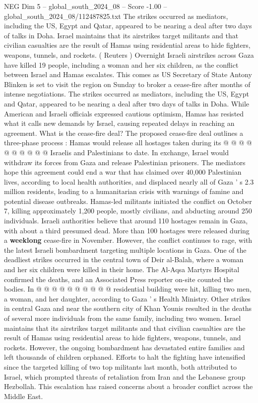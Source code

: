 \begin{textsample}{NEG Dim 5 – global\_south\_2024\_08 – Score -1.00 – global\_south\_2024\_08/112487825.txt}  \label{ex:f5_neg_122}
The strikes occurred as mediators, including the US, Egypt and Qatar, appeared to be nearing a deal after two days of talks in Doha.
Israel maintains that its airstrikes target militants and that civilian casualties are the result of Hamas using residential areas to hide fighters, weapons, tunnels, and rockets. ( Reuters ) Overnight Israeli airstrikes across Gaza have killed 19 people, including a woman and her six children, as the conflict between Israel and Hamas escalates.
This comes as US Secretary of State Antony Blinken is set to visit the region on Sunday to broker a cease-fire after months of intense negotiations.
The strikes occurred as mediators, including the US, Egypt and Qatar, appeared to be nearing a deal after two days of talks in Doha.
While American and Israeli officials expressed cautious optimism, Hamas has resisted what it calls new demands by Israel, causing repeated delays in reaching an agreement.
What is the cease-fire deal?
The proposed cease-fire deal outlines a three-phase process : Hamas would release all hostages taken during its @ @ @ @ @ @ @ @ @ @ Israelis and Palestinians to date.
In exchange, Israel would withdraw its forces from Gaza and release Palestinian prisoners.
The mediators hope this agreement could end a war that has claimed over 40,000 Palestinian lives, according to local health authorities, and displaced nearly all of Gaza ' s 2.3 million residents, leading to a humanitarian crisis with warnings of famine and potential disease outbreaks.
Hamas-led militants initiated the conflict on October 7, killing approximately 1,200 people, mostly civilians, and abducting around 250 individuals.
Israeli authorities believe that around 110 hostages remain in Gaza, with about a third presumed dead.
More than 100 hostages were released during a \textbf{weeklong} cease-fire in November.
However, the conflict continues to rage, with the latest Israeli bombardment targeting multiple locations in Gaza.
One of the deadliest strikes occurred in the central town of Deir al-Balah, where a woman and her six children were killed in their home.
The Al-Aqsa Martyrs Hospital confirmed the deaths, and an Associated Press reporter on-site counted the bodies.
In @ @ @ @ @ @ @ @ @ @ residential building were hit, killing two men, a woman, and her daughter, according to Gaza ' s Health Ministry.
Other strikes in central Gaza and near the southern city of Khan Younis resulted in the deaths of several more individuals from the same family, including two women.
Israel maintains that its airstrikes target militants and that civilian casualties are the result of Hamas using residential areas to hide fighters, weapons, tunnels, and rockets.
However, the ongoing bombardment has devastated entire families and left thousands of children orphaned.
Efforts to halt the fighting have intensified since the targeted killing of two top militants last month, both attributed to Israel, which prompted threats of retaliation from Iran and the Lebanese group Hezbollah.
This escalation has raised concerns about a broader conflict across the Middle East.

\end{textsample}
